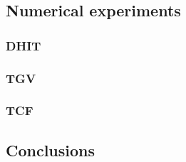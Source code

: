 \documentclass[compress,11 pt,t]{beamer}
\begin{document}
%

\subsection{Numerical experiments}


\subsubsection{DHIT}


\subsubsection{TGV}


\subsubsection{TCF}


\subsection{Conclusions}

\end{document}
